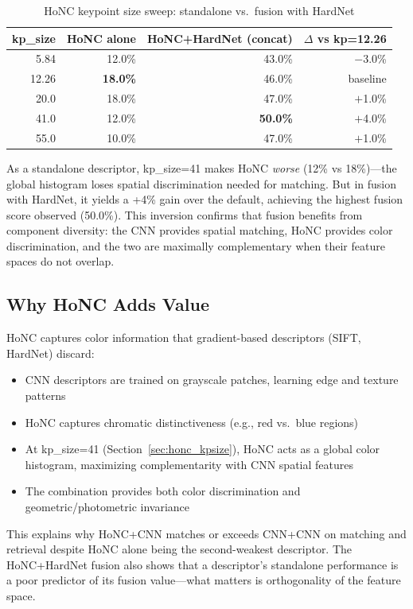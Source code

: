 \begin{table}[ht]
\centering
\caption{HoNC keypoint size sweep: standalone vs.\ fusion with HardNet}
\label{tab:honc_sweep}
\begin{tabular}{rrrr}
\toprule
\textbf{kp\_size} & \textbf{HoNC alone} & \textbf{HoNC+HardNet (concat)} & \textbf{$\Delta$ vs kp=12.26} \\
\midrule
5.84 & 12.0\% & 43.0\% & $-$3.0\% \\
12.26 & \textbf{18.0\%} & 46.0\% & baseline \\
20.0 & 18.0\% & 47.0\% & $+$1.0\% \\
41.0 & 12.0\% & \textbf{50.0\%} & $+$4.0\% \\
55.0 & 10.0\% & 47.0\% & $+$1.0\% \\
\bottomrule
\end{tabular}
\end{table}

As a standalone descriptor, kp\_size=41 makes HoNC \textit{worse} (12\% vs 18\%)---the global histogram loses spatial discrimination needed for matching. But in fusion with HardNet, it yields a +4\% gain over the default, achieving the highest fusion score observed (50.0\%). This inversion confirms that fusion benefits from component diversity: the CNN provides spatial matching, HoNC provides color discrimination, and the two are maximally complementary when their feature spaces do not overlap.

\subsection{Why HoNC Adds Value}

HoNC captures color information that gradient-based descriptors (SIFT, HardNet) discard:
\begin{itemize}
    \item CNN descriptors are trained on grayscale patches, learning edge and texture patterns
    \item HoNC captures chromatic distinctiveness (e.g., red vs.\ blue regions)
    \item At kp\_size=41 (Section~\ref{sec:honc_kpsize}), HoNC acts as a global color histogram, maximizing complementarity with CNN spatial features
    \item The combination provides both color discrimination and geometric/photometric invariance
\end{itemize}

This explains why HoNC+CNN matches or exceeds CNN+CNN on matching and retrieval despite HoNC alone being the second-weakest descriptor. The HoNC+HardNet fusion also shows that a descriptor's standalone performance is a poor predictor of its fusion value---what matters is orthogonality of the feature space.

